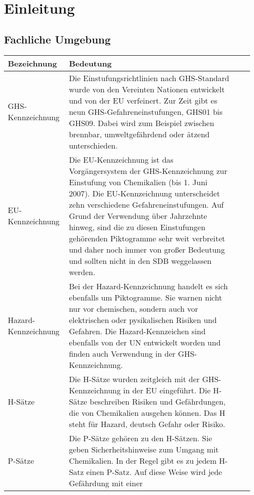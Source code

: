 \chapter{Einleitung}
\label{einleitung}

\section{Fachliche Umgebung}
\label{fachliche_domaene}

\begin{table}
  \begin{tabular}{|p{}|p{}|l|l|} \hline
   \textbf{Bezeichnung} & \textbf{Bedeutung}\\ \hline \hline
     GHS-Kennzeichnung & Die Einstufungsrichtlinien nach \ac{GHS}-Standard wurde 
     von den Vereinten Nationen entwickelt und von der EU verfeinert. Zur Zeit
     gibt es neun \ac{GHS}-Gefahreneinstufungen, GHS01 bis GHS09. Dabei wird zum
     Beispiel zwischen brennbar, umweltgefährdend oder ätzend unterschieden.
     \\ 
     \hline
     EU-Kennzeichnung & Die EU-Kennzeichnung ist das Vorgängersystem der
     GHS-Kennzeichnung zur Einstufung von Chemikalien (bis 1. Juni 2007). Die
     EU-Kennzeichnung unterscheidet zehn verschiedene Gefahreneinstufungen. Auf
     Grund der Verwendung über Jahrzehnte hinweg, sind die zu diesen
     Einstufungen gehörenden Piktogramme sehr weit verbreitet und daher noch
     immer von großer Bedeutung und sollten nicht in den \ac{SDB} weggelassen
     werden.
     \\
     \hline 
     Hazard-Kennzeichnung & Bei der Hazard-Kennzeichnung handelt es sich
     ebenfalls um Piktogramme. Sie warnen nicht nur vor chemischen, sondern auch
     vor elektrischen oder pysikalischen Risiken und Gefahren. Die
     Hazard-Kennzeichen sind ebenfalls von der UN entwickelt worden und finden
     auch Verwendung in der \ac{GHS}-Kennzeichnung. 
     \\
     \hline
     H-Sätze & Die H-Sätze wurden zeitgleich mit der \ac{GHS}-Kennzeichnung in
     der EU eingeführt. Die H-Sätze beschreiben Risiken und Gefährdungen, die von
     Chemikalien ausgehen können. Das H steht für Hazard, deutsch Gefahr oder Risiko.
     \\
     \hline 
     P-Sätze & Die P-Sätze gehören zu den H-Sätzen. Sie geben
     Sicherheitshinweise zum Umgang mit Chemikalien. In der Regel gibt es zu
     jedem H-Satz einen P-Satz. Auf diese Weise wird jede Gefährdung mit einer

\end{tabular}
\end{table}
